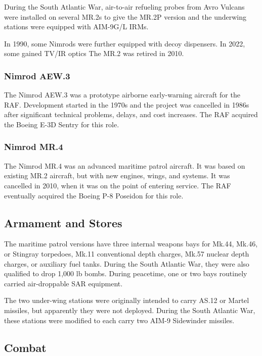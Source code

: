 During the South Atlantic War, air-to-air refueling probes from Avro Vulcans were installed on several MR.2s to give the MR.2P version and the underwing stations were equipped with AIM-9G/L IRMs.

In 1990, some Nimrods were further equipped with decoy dispensers. In 2022, some gained TV/IR optics The MR.2 was retired in 2010.

\subsubsection{Nimrod AEW.3}

The Nimrod AEW.3 was a prototype airborne early-warning aircraft for the RAF. Development started in the 1970s and the project was cancelled in 1986s after significant technical problems, delays, and cost increases. The RAF acquired the Boeing E-3D Sentry for this role.

\subsubsection{Nimrod MR.4}

The Nimrod MR.4 was an advanced maritime patrol aircraft. It was based on existing MR.2 aircraft, but with new engines, wings, and systems. It was cancelled in 2010, when it was on the point of entering service. The RAF eventually acquired the Boeing P-8 Poseidon for this role.

\subsection{Armament and Stores}

The maritime patrol versions have three internal weapons bays for Mk.44, Mk.46, or Stingray torpedoes, Mk.11 conventional depth charges, Mk.57 nuclear depth charges, or auxiliary fuel tanks. During the South Atlantic War, they were also qualified to drop 1,000 lb bombs. During peacetime, one or two bays routinely carried air-droppable SAR equipment.

The two under-wing stations were originally intended to carry AS.12 or Martel missiles, but apparently they were not deployed. During the South Atlantic War, these stations were modified to each carry two AIM-9 Sidewinder missiles.

\subsection{Combat}

